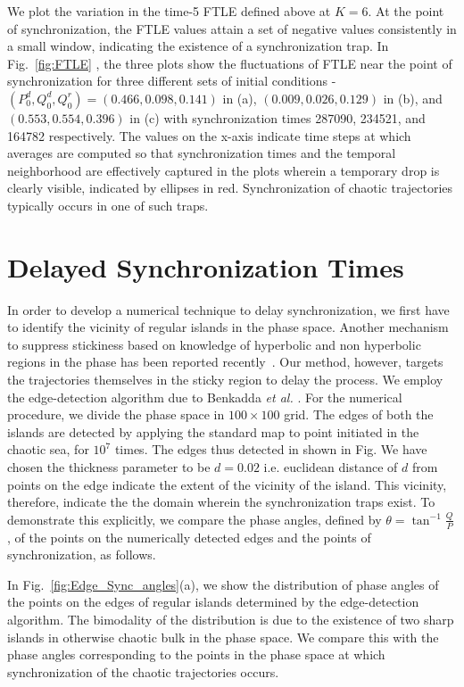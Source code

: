 \documentclass[preprint,showpacs,preprintnumbers,amsmath,amssymb]{revtex4-1}
\begin{document}
We plot the variation in the time-5 FTLE defined above at $K = 6$. At the point of synchronization, the FTLE values attain a set of negative values consistently in a small window, indicating the existence of a synchronization trap.  In Fig.~\ref{fig:FTLE} , the three plots show the fluctuations  of FTLE near the point of synchronization for three different sets of initial conditions - $(P^d_0,Q^d_0,Q^r_0) = (0.466,0.098,0.141)$ in (a),  $(0.009,0.026,0.129)$ in (b), and $(0.553,0.554,0.396)$ in (c) with synchronization times 287090, 234521, and 164782 respectively. The values on the x-axis indicate time steps at which averages are computed so that synchronization times and the temporal neighborhood are effectively captured in the plots wherein a temporary drop is clearly visible, indicated by ellipses in red. Synchronization of chaotic trajectories typically occurs in one of such traps. 

\section{Delayed Synchronization Times}
\label{sec:delay}
In order to develop a numerical technique to delay synchronization, we  first have to identify the vicinity of regular islands in the phase space. Another mechanism  to suppress stickiness based on knowledge of hyperbolic and non hyperbolic regions in the phase has been reported recently~\cite{Kruger2015}. Our method, however, targets the trajectories themselves in the sticky region to delay the process. We employ the edge-detection algorithm due to Benkadda {\it et al.} \cite{Benkadda1997}. For the numerical procedure, we divide the phase space in $100 \times 100$ grid. The edges of both the islands are detected by applying the standard map to point initiated in the chaotic sea, for $10^7$ times.  The edges thus detected in shown in Fig.  We have chosen the thickness parameter to be $d = 0.02$ i.e. euclidean distance of $d$ from points on the edge indicate the extent of the vicinity of the island.  This vicinity, therefore, indicate the the domain wherein the synchronization traps exist.  To demonstrate this explicitly, we compare the phase angles, defined by $\theta = \tan^{-1}\frac{Q}{P}$, of the points on the numerically detected edges and the points of synchronization, as follows. 

In Fig.~\ref{fig:Edge_Sync_angles}(a), we show the distribution of phase angles of the points on the edges of regular islands determined by the edge-detection algorithm.  The bimodality of the distribution is due to the existence of two sharp islands in otherwise chaotic bulk in the phase space.  We compare this with the phase angles corresponding to the points in the phase space at which synchronization of the chaotic trajectories occurs.
\end{document}
